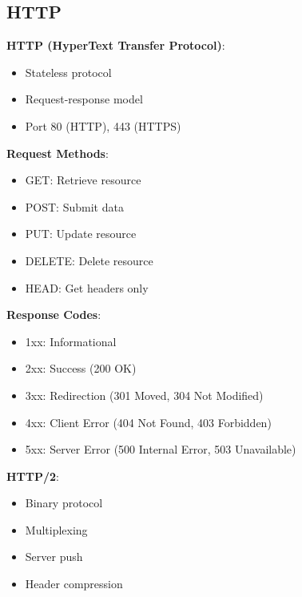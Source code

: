 \documentclass[12pt,a4paper]{report}
\begin{document}
\subsection{HTTP}
\begin{concept}
\textbf{HTTP (HyperText Transfer Protocol)}:
\begin{itemize}
    \item Stateless protocol
    \item Request-response model
    \item Port 80 (HTTP), 443 (HTTPS)
\end{itemize}

\textbf{Request Methods}:
\begin{itemize}
    \item GET: Retrieve resource
    \item POST: Submit data
    \item PUT: Update resource
    \item DELETE: Delete resource
    \item HEAD: Get headers only
\end{itemize}

\textbf{Response Codes}:
\begin{itemize}
    \item 1xx: Informational
    \item 2xx: Success (200 OK)
    \item 3xx: Redirection (301 Moved, 304 Not Modified)
    \item 4xx: Client Error (404 Not Found, 403 Forbidden)
    \item 5xx: Server Error (500 Internal Error, 503 Unavailable)
\end{itemize}

\textbf{HTTP/2}:
\begin{itemize}
    \item Binary protocol
    \item Multiplexing
    \item Server push
    \item Header compression
\end{itemize}
\end{concept}
\end{document}

